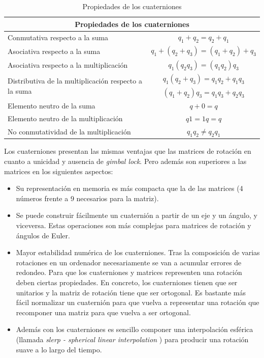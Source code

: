 \documentclass[12pt, a4paper]{report}
\begin{document}
\begin{table}[h]
\center
\begin{tabular}{|l|c|}

\hline
\multicolumn{2}{|c|}{\textbf{Propiedades de los cuaterniones}}\\
\hline
Conmutativa respecto a la suma & $ q_1 + q_2 = q_2 + q_1 $ \\
\hline
Asociativa respecto a la suma & $ q_1 + (q_2 + q_3) = (q_1 + q_2) + q_3 $ \\
\hline
Asociativa respecto a la multiplicación & $ q_1(q_2q_3) = (q_1q_2)q_3 $ \\
\hline
\multirow{2}{*}{Distributiva de la multiplicación respecto a la suma} & $ q_1(q_2 + q_3) = q_1q_2 + q_1q_3 $ \\
\cline{2-2}
 & $ (q_1 + q_2)q_3 = q_1q_3 + q_2q_3 $ \\
\hline
Elemento neutro de la suma & $ q + 0 = q $ \\
\hline
Elemento neutro de la multiplicación & $ q1 = 1q = q $ \\
\hline
No conmutatividad de la multiplicación & $q_1q_2 \not= q_2q_1$\\
\hline
\end{tabular}

\caption{Propiedades de los cuaterniones}
\label{tab:propiedades_cuaterniones}

\end{table}

Los cuaterniones presentan las mismas ventajas que las matrices de rotación en cuanto a unicidad y ausencia de \textit{gimbal lock}. Pero además son superiores a las matrices en los siguientes aspectos:

\begin{itemize}

\item Su representación en memoria es más compacta que la de las matrices (4 números frente a 9 necesarios para la matriz).

\item Se puede construir fácilmente un cuaternión a partir de un eje y un ángulo, y viceversa. Estas operaciones son más complejas para matrices de rotación y ángulos de Euler.

\item Mayor estabilidad numérica de los cuaterniones. Tras la composición de varias rotaciones en un ordenador necesariamente se van a acumular errores de redondeo. Para que los cuaterniones y matrices representen una rotación deben ciertas propiedades. En concreto, los cuaterniones tienen que ser unitarios y la matriz de rotación tiene que ser ortogonal. Es bastante más fácil normalizar un cuaternión para que vuelva a representar una rotación que recomponer una matriz para que vuelva a ser ortogonal.

\item Además con los cuaterniones es sencillo componer una interpolación esférica (llamada \textit{slerp - spherical linear interpolation} ) para producir una rotación suave a lo largo del tiempo.

\end{itemize}
\end{document}
